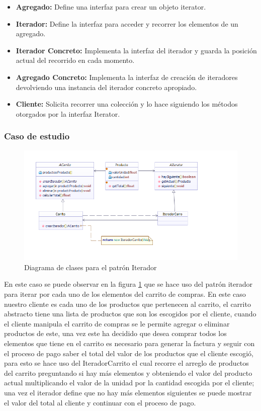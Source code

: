 \begin{itemize}
	\item \textbf{Agregado: }Define una interfaz para crear un objeto iterator.
	\item \textbf{Iterador: }Define la interfaz para acceder y recorrer los elementos de un agregado.
	\item \textbf{Iterador Concreto: }Implementa la interfaz del iterador y guarda la posición actual del recorrido en cada momento.
	\item \textbf{Agregado Concreto: }Implementa la interfaz de creación de iteradores devolviendo una instancia del iterador concreto apropiado.
	\item \textbf{Cliente: }Solicita recorrer una colección y lo hace siguiendo los métodos otorgados por la interfaz Iterator. 
\end{itemize}

\subsubsection{Caso de estudio}

\begin{figure}[th!]
	\centering
	\includegraphics[width=0.9\linewidth]{arquitectura/imagenes/DiagramaIterador}
	\caption{Diagrama de clases para el patrón Iterador}
	\label{fig:patronIterador}
\end{figure}

En este caso se puede observar en la figura \ref{fig:patronIterador} que se hace uso del patrón iterador para iterar por cada uno de los elementos del carrito de compras. En este caso nuestro cliente es cada uno de los productos que pertenecen al carrito, el carrito abstracto tiene una lista de productos que son los escogidos por el cliente, cuando el cliente manipula el carrito de compras se le permite agregar o eliminar productos de este, una vez este ha decidido que desea comprar todos los elementos que tiene en el carrito es necesario para generar la factura y seguir con el proceso de pago saber el total del valor de los productos que el cliente escogió, para esto se hace uso del IteradorCarrito  el cual recorre el arreglo de productos del carrito preguntando si hay más elementos y obteniendo el valor del producto actual multiplicando el valor de la unidad por la cantidad escogida por el cliente; una vez el iterador define que no hay más elementos siguientes se puede mostrar el valor del total al cliente y continuar con el proceso de pago.

